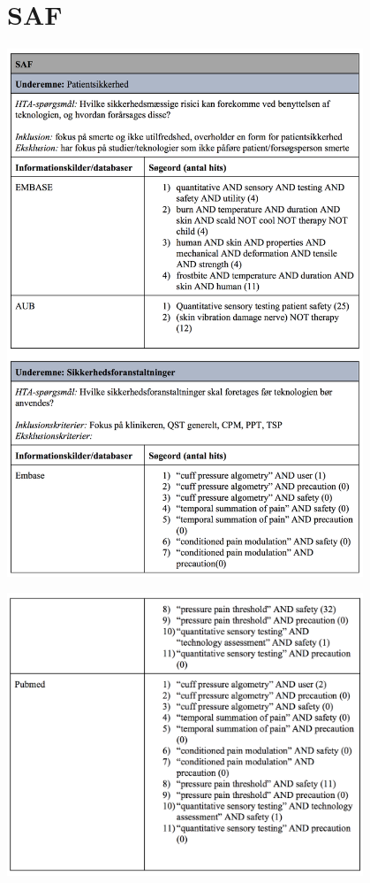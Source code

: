 \section{SAF}\label{SAF_sog}
\includegraphics[width=0.8\textwidth]{rapportAfsnit/qBilag/sogninger/SAF1}

\includegraphics[width=0.8\textwidth]{rapportAfsnit/qBilag/sogninger/SAF2}

